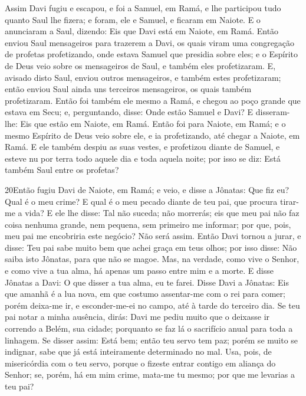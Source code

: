 Assim Davi fugiu e escapou, e foi a Samuel, em Ramá, e lhe
participou tudo quanto Saul lhe fizera; e foram, ele e Samuel, e
ficaram em Naiote. E o anunciaram a Saul, dizendo: Eis que
Davi está em Naiote, em Ramá. Então enviou Saul mensageiros
para trazerem a Davi, os quais viram uma congregação de profetas
profetizando, onde estava Samuel que presidia sobre eles; e o
Espírito de Deus veio sobre os mensageiros de Saul, e também eles
profetizaram. E, avisado disto Saul, enviou outros
mensageiros, e também estes profetizaram; então enviou Saul ainda
uns terceiros mensageiros, os quais também profetizaram.
Então foi também ele mesmo a Ramá, e chegou ao poço grande
que estava em Secu; e, perguntando, disse: Onde estão Samuel e Davi?
E disseram-lhe: Eis que estão em Naiote, em Ramá. Então foi
para Naiote, em Ramá; e o mesmo Espírito de Deus veio sobre ele, e
ia profetizando, até chegar a Naiote, em Ramá. E ele também
despiu as suas vestes, e profetizou diante de Samuel, e esteve nu
por terra todo aquele dia e toda aquela noite; por isso se diz: Está
também Saul entre os profetas?

\medskip

\lettrine{20} Então fugiu Davi de Naiote, em Ramá; e veio, e
disse a Jônatas: Que fiz eu? Qual é o meu crime? E qual é o meu
pecado diante de teu pai, que procura tirar-me a vida? E ele lhe
disse: Tal não suceda; não morrerás; eis que meu pai não faz coisa
nenhuma grande, nem pequena, sem primeiro me informar; por que,
pois, meu pai me encobriria este negócio? Não será assim. Então
Davi tornou a jurar, e disse: Teu pai sabe muito bem que achei graça
em teus olhos; por isso disse: Não saiba isto Jônatas, para que não
se magoe. Mas, na verdade, como vive o Senhor, e como vive a tua
alma, há apenas um passo entre mim e a morte. E disse Jônatas a
Davi: O que disser a tua alma, eu te farei. Disse Davi a
Jônatas: Eis que amanhã é a lua nova, em que costumo assentar-me com
o rei para comer; porém deixa-me ir, e esconder-me-ei no campo, até
à tarde do terceiro dia. Se teu pai notar a minha ausência,
dirás: Davi me pediu muito que o deixasse ir correndo a Belém, sua
cidade; porquanto se faz lá o sacrifício anual para toda a linhagem.
Se disser assim: Está bem; então teu servo tem paz; porém se
muito se indignar, sabe que já está inteiramente determinado no mal.
Usa, pois, de misericórdia com o teu servo, porque o fizeste
entrar contigo em aliança do Senhor; se, porém, há em mim crime,
mata-me tu mesmo; por que me levarias a teu pai?

